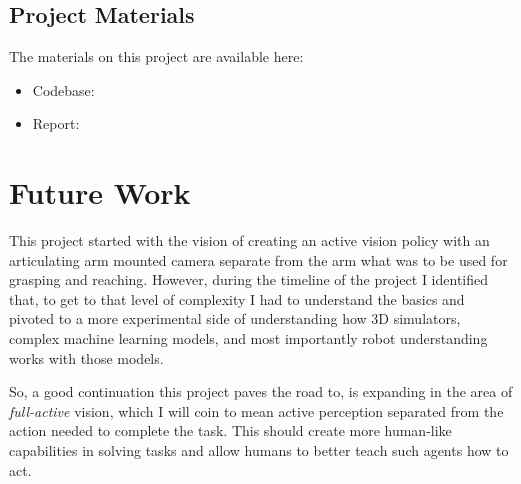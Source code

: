   \subsection{Project Materials}
  The materials on this project are available here:
  \begin{itemize}
    \item Codebase: 
    \item Report: 
  \end{itemize}

\section{Future Work}
This project started with the vision of creating an active vision policy with an articulating arm mounted camera separate from the arm what was to be used for grasping and reaching. However, during the timeline of the project I identified that, to get to that level of complexity I had to understand the basics and pivoted to a more experimental side of understanding how 3D simulators, complex machine learning models, and most importantly robot understanding works with those models.

So, a good continuation this project paves the road to, is expanding in the area of \emph{full-active} vision, which I will coin to mean active perception separated from the action needed to complete the task. This should create more human-like capabilities in solving tasks and allow humans to better teach such agents how to act.